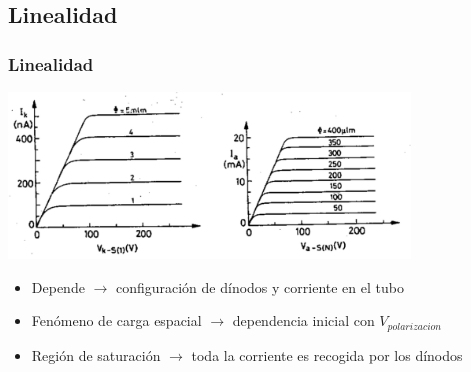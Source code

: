 \documentclass{beamer}
\begin{document}
\subsection{Linealidad}

\begin{frame}
\frametitle{Linealidad}
\begin{center}
\includegraphics[width=0.8\textwidth]{d1/saturation_ia_ik}
\end{center}
\begin{alertblock}{}
\begin{itemize}
\item Depende $\rightarrow$ configuración de dínodos y corriente en el tubo
\item Fenómeno de \alert{carga espacial} $\rightarrow$ dependencia inicial con
$V_{polarizacion}$
\item Región de saturación $\rightarrow$ toda la corriente es recogida por los
dínodos
\end{itemize}
\end{alertblock}
\end{frame} 


\end{document}
